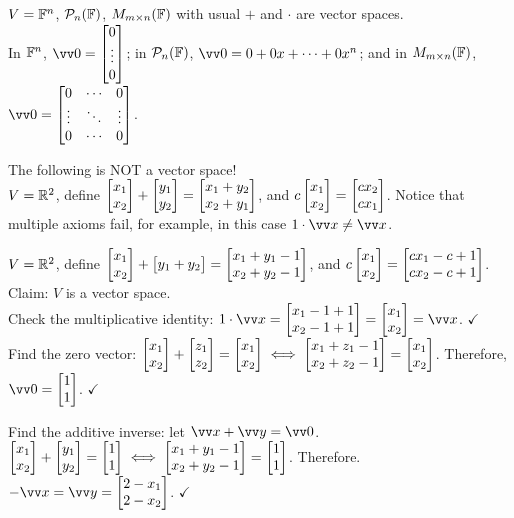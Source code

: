 \begin{example}
    $V = {\mathbb{F}}^n$, $\mathcal{P}_n({\mathbb{F}})$, $M_{m \times n}({\mathbb{F}})$ with usual $+$ and $\cdot$ are vector spaces.   \\
    In ${\mathbb{F}}^n$, $\vzero = \cv{0 \\ \vdots \\ 0}$; in $\mathcal{P}_n({\mathbb{F}})$, $\vzero = 0 + 0x + \cdots + 0x^n$;
    and in $M_{m \times n}({\mathbb{F}})$, $\vzero = 
    \begin{bmatrix}
        0 & \cdots & 0\\ 
        \vdots & \ddots & \vdots\\ 
        0 & \cdots & 0
    \end{bmatrix}$.
\end{example}

\begin{example}
    The following is NOT a vector space!    \\
    $V = {\mathbb{R}}^2$, define $\begin{bmatrix} x_1 \\ x_2 \end{bmatrix} + \begin{bmatrix} y_1 \\ y_2 \end{bmatrix} = \begin{bmatrix} x_1 + y_2 \\ x_2 + y_1 \end{bmatrix}$, and
    $c\begin{bmatrix} x_1 \\ x_2 \end{bmatrix} = \begin{bmatrix} cx_2 \\ cx_1 \end{bmatrix}$. Notice that multiple axioms fail, for example, in this case
    $1 \cdot \vx \neq \vx$.
\end{example}

\begin{example}
    $V = {\mathbb{R}}^2$, define $\begin{bmatrix} x_1 \\ x_2 \end{bmatrix} + \begin{bmatrix} y_1 + y_2 \end{bmatrix} = \begin{bmatrix} x_1 + y_1 - 1 \\ x_2 + y_2 - 1 \end{bmatrix}$, and
    $c\begin{bmatrix} x_1 \\ x_2 \end{bmatrix} = \begin{bmatrix} cx_1 - c + 1 \\ cx_2 - c + 1 \end{bmatrix}$. \\ Claim: $V$ is a vector space. \\
    Check the multiplicative identity: $1 \cdot \vx = \cv{x_1 - 1 + 1 \\ x_2 - 1 + 1} = \cv{x_1 \\ x_2} = \vx$.     $\checkmark$ \\
    Find the zero vector: $\begin{bmatrix} x_1 \\ x_2 \end{bmatrix} + \begin{bmatrix} z_1 \\ z_2 \end{bmatrix} = \begin{bmatrix} x_1 \\ x_2 \end{bmatrix} \iff \begin{bmatrix} x_1 + z_1 - 1 \\ x_2 + z_2 - 1 \end{bmatrix} = \begin{bmatrix} x_1 \\ x_2 \end{bmatrix}$.
    Therefore, $\vzero = \cv{1 \\ 1}$. $\checkmark$

    Find the additive inverse: let $\vx + \vy = \vzero$. \vspace{1mm}    \\
    $\begin{bmatrix} x_1 \\ x_2 \end{bmatrix} + \begin{bmatrix} y_1 \\ y_2 \end{bmatrix} = \begin{bmatrix} 1 \\ 1 \end{bmatrix} \iff \begin{bmatrix} x_1 + y_1 - 1 \\ x_2 + y_2 - 1 \end{bmatrix} = \begin{bmatrix} 1 \\ 1 \end{bmatrix}$. Therefore. $-\vx = \vy = \cv{2-x_1 \\ 2-x_2}$. $\checkmark$
\end{example}

